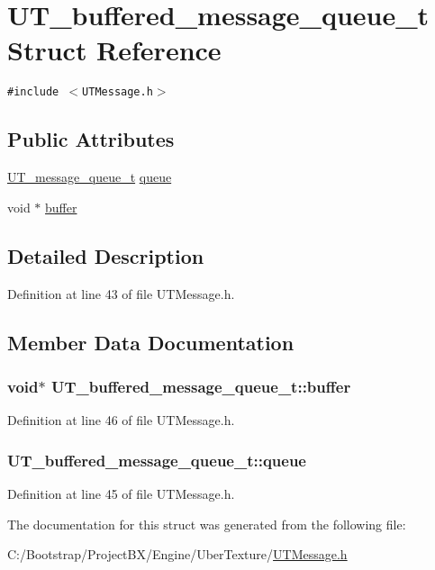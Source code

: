 \hypertarget{struct_u_t__buffered__message__queue__t}{
\section{UT\_\-buffered\_\-message\_\-queue\_\-t Struct Reference}
\label{struct_u_t__buffered__message__queue__t}
}
{\tt \#include $<$UTMessage.h$>$}

\subsection*{Public Attributes}
\begin{CompactItemize}
\item 
\hyperlink{struct_u_t__message__queue__t}{UT\_\-message\_\-queue\_\-t} \hyperlink{struct_u_t__buffered__message__queue__t_cc01c02fbef9d7e363ac4da097bf72b8}{queue}
\item 
void $\ast$ \hyperlink{struct_u_t__buffered__message__queue__t_f260844ca891321acfbb1118ef72299c}{buffer}
\end{CompactItemize}


\subsection{Detailed Description}


Definition at line 43 of file UTMessage.h.

\subsection{Member Data Documentation}
\hypertarget{struct_u_t__buffered__message__queue__t_f260844ca891321acfbb1118ef72299c}{
\subsubsection[{buffer}]{\setlength{\rightskip}{0pt plus 5cm}void$\ast$ {\bf UT\_\-buffered\_\-message\_\-queue\_\-t::buffer}}}
\label{struct_u_t__buffered__message__queue__t_f260844ca891321acfbb1118ef72299c}




Definition at line 46 of file UTMessage.h.\hypertarget{struct_u_t__buffered__message__queue__t_cc01c02fbef9d7e363ac4da097bf72b8}{
\subsubsection[{queue}]{ {\bf UT\_\-buffered\_\-message\_\-queue\_\-t::queue}}}
\label{struct_u_t__buffered__message__queue__t_cc01c02fbef9d7e363ac4da097bf72b8}




Definition at line 45 of file UTMessage.h.

The documentation for this struct was generated from the following file:\begin{CompactItemize}
\item 
C:/Bootstrap/ProjectBX/Engine/UberTexture/\hyperlink{_u_t_message_8h}{UTMessage.h}\end{CompactItemize}
